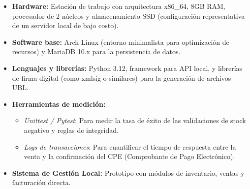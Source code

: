 \begin{itemize}
    \item \textbf{Hardware:} Estación de trabajo con arquitectura x86\_64, 8GB RAM, procesador de 2 núcleos y almacenamiento SSD (configuración representativa de un servidor local de bajo costo).
    
    \item \textbf{Software base:} Arch Linux (entorno minimalista para optimización de recursos) y MariaDB 10.x para la persistencia de datos.
    
    \item \textbf{Lenguajes y librerías:} Python 3.12, framework para API local, y librerías de firma digital (como xmlsig o similares) para la generación de archivos UBL.
    
    \item \textbf{Herramientas de medición:} 
    \begin{itemize}
        \item \textit{Unittest / Pytest}: Para medir la tasa de éxito de las validaciones de stock negativo y reglas de integridad.
        \item \textit{Logs de transacciones}: Para cuantificar el tiempo de respuesta entre la venta y la confirmación del CPE (Comprobante de Pago Electrónico).
    \end{itemize}
    
    \item \textbf{Sistema de Gestión Local:} Prototipo con módulos de inventario, ventas y facturación directa.
\end{itemize}



